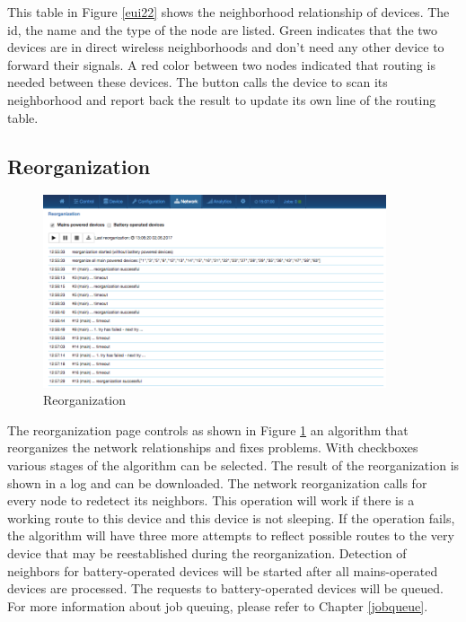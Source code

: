 {This table in Figure \ref{eui22} shows the neighborhood relationship of devices. The id,
 the name and the type of the node are listed. Green indicates that the two devices are 
 in direct wireless neighborhoods and don’t need any other device to forward their signals.  
 A red color between two nodes indicated that routing is needed between these devices.  
 The  button calls the device to scan its neighborhood and report back the 
 result to update its own line of the routing table.

\subsection{Reorganization}

\begin{figure}
\begin{center}
\includegraphics[width=0.9\textwidth]{pngs/cap7/eui23.png}
\caption{Reorganization}
\label{eui23}
\end{center}
\end{figure}

The reorganization page controls as shown in Figure \ref{eui23} an algorithm that 
reorganizes the network relationships and fixes problems. With checkboxes various stages 
of the algorithm can be selected. The result of the reorganization is shown in a log and 
can be downloaded. The network reorganization calls for every node to redetect its neighbors. 
This operation will work if there is a working route to this device and this device is 
not sleeping. If the operation fails, the algorithm will have three more attempts to 
reflect possible routes to the very device that may be reestablished during the 
reorganization. Detection of neighbors for battery-operated devices will be started after 
all mains-operated devices are processed. The requests to battery-operated devices will 
be queued. For more information about job queuing, please refer to Chapter \ref{jobqueue}.

}
